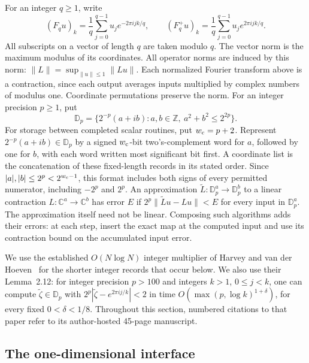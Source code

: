 \documentclass[11pt]{article}
\theoremstyle{definition}
\begin{document}
For an integer $q\geq 1$, write
\[
 (F_q u)_k=\frac1q\sum_{j=0}^{q-1}u_j e^{-2\pi i jk/q},
 \qquad
 (F_q^+ u)_k=\frac1q\sum_{j=0}^{q-1}u_j e^{2\pi i jk/q}.
\]
All subscripts on a vector of length $q$ are taken modulo $q$.
The vector norm is the maximum modulus of its coordinates. All operator
norms are induced by this norm: $\|L\|=\sup_{\|u\|\leq1}\|Lu\|$.
Each normalized Fourier transform above is a contraction, since each
output averages inputs multiplied by complex numbers of modulus one. Coordinate
permutations preserve the norm.
For an integer precision $p\geq1$, put
\[
 \mathbb D_p=\{2^{-p}(a+ib):a,b\in\mathbb Z,\ a^2+b^2\leq 2^{2p}\}.
\]
For storage between completed scalar routines, put $w_{\rm c}=p+2$.
Represent $2^{-p}(a+ib)\in\mathbb D_p$ by a signed $w_{\rm c}$-bit
two's-complement word for $a$, followed by one for $b$, with each word
written most significant bit first. A coordinate list is the
concatenation of these fixed-length records in its stated order. Since
$|a|,|b|\leq2^p<2^{w_{\rm c}-1}$, this format includes both signs of
every permitted numerator, including $-2^p$ and $2^p$.
An approximation $\widetilde L:\mathbb D_p^a\to\mathbb D_p^b$
to a linear contraction $L:\mathbb C^a\to\mathbb C^b$ has error $E$
if $2^p\|\widetilde L u-Lu\|<E$ for every input in $\mathbb D_p^a$.
The approximation itself need not be linear. Composing such algorithms
adds their errors: at each step, insert the exact map at the computed
input and use its contraction bound on the accumulated input error.

We use the established $O(N\log N)$ integer multiplier of
Harvey and van der Hoeven~\cite[Theorem~1.1]{HarveyHoeven2021}
for the shorter integer records that occur below. We also use their
Lemma~2.12: for integer precision $p>100$ and integers $k>1$, $0\leq j<k$,
one can compute $\widetilde\zeta\in\mathbb D_p$ with
$2^p|\widetilde\zeta-e^{2\pi i j/k}|<2$ in time
$O(\max(p,\log k)^{1+\delta})$, for every fixed $0<\delta<1/8$.
Throughout this section, numbered citations to that paper refer to its
author-hosted 45-page manuscript.

\subsection{The one-dimensional interface}
\end{document}
